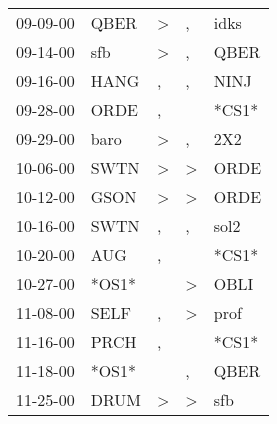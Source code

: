\begin{supertabular}{p{0.07\textwidth}p{0.06\textwidth}p{0.02\textwidth}p{0.02\textwidth}p{0.06\textwidth}}
          09-09-00\textsuperscript{} &           QBER\textsuperscript{} &     \textgreater &                , &           idks\textsuperscript{} \\
          09-14-00\textsuperscript{} &            sfb\textsuperscript{} &     \textgreater &                , &           QBER\textsuperscript{} \\
          09-16-00\textsuperscript{} &           HANG\textsuperscript{} &                , &                , &           NINJ\textsuperscript{} \\
          09-28-00\textsuperscript{} &           ORDE\textsuperscript{} &                , &                  &                            *CS1* \\
          09-29-00\textsuperscript{} &           baro\textsuperscript{} &     \textgreater &                , &            2X2\textsuperscript{} \\
          10-06-00\textsuperscript{} &           SWTN\textsuperscript{} &     \textgreater &     \textgreater &           ORDE\textsuperscript{} \\
          10-12-00\textsuperscript{} &           GSON\textsuperscript{} &     \textgreater &     \textgreater &           ORDE\textsuperscript{} \\
          10-16-00\textsuperscript{} &           SWTN\textsuperscript{} &                , &                , &           sol2\textsuperscript{} \\
          10-20-00\textsuperscript{} &            AUG\textsuperscript{} &                , &                  &                            *CS1* \\
          10-27-00\textsuperscript{} &                            *OS1* &                  &     \textgreater &           OBLI\textsuperscript{} \\
          11-08-00\textsuperscript{} &           SELF\textsuperscript{} &                , &     \textgreater &           prof\textsuperscript{} \\
          11-16-00\textsuperscript{} &           PRCH\textsuperscript{} &                , &                  &                            *CS1* \\
          11-18-00\textsuperscript{} &                            *OS1* &                  &                , &           QBER\textsuperscript{} \\
          11-25-00\textsuperscript{} &           DRUM\textsuperscript{} &     \textgreater &     \textgreater &            sfb\textsuperscript{} \\

\end{supertabular}
